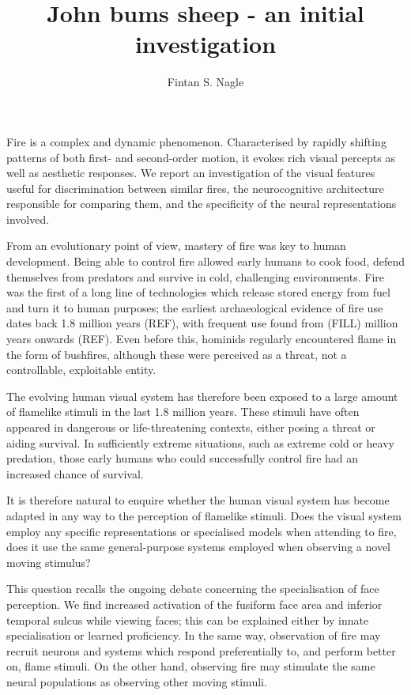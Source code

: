 \documentclass[a4paper]{article}
\title{John bums sheep - an initial investigation}
\author{Fintan S. Nagle}
\begin{document}
\maketitle


Fire is a complex and dynamic phenomenon. Characterised by rapidly shifting patterns of both first- and second-order motion, it evokes rich visual percepts as well as aesthetic responses. We report an investigation of the visual features useful for discrimination between similar fires, the neurocognitive architecture responsible for comparing them, and the specificity of the neural representations involved.


From an evolutionary point of view, mastery of fire was key to human development. Being able to control fire allowed early humans to cook food, defend themselves from predators and survive in cold, challenging environments. Fire was the first of a long line of technologies which release stored energy from fuel and turn it to human purposes; the earliest archaeological evidence of fire use dates back 1.8 million years (REF), with frequent use found from (FILL) million years onwards (REF). Even before this, hominids regularly encountered flame in the form of bushfires, although these were perceived as a threat, not a controllable, exploitable entity.

The evolving human visual system has therefore been exposed to a large amount of flamelike stimuli in the last 1.8 million years. These stimuli have often appeared in dangerous or life-threatening contexts, either posing a threat or aiding survival. In sufficiently extreme situations, such as extreme cold or heavy predation, those early humans who could successfully control fire had an increased chance of survival.

It is therefore natural to enquire whether the human visual system has become adapted in any way to the perception of flamelike stimuli. Does the visual system employ any specific representations or specialised models when attending to fire, does it use the same general-purpose systems employed when observing a novel moving stimulus?

This question recalls the ongoing debate concerning the specialisation of face perception. We find increased activation of the fusiform face area and inferior temporal sulcus while viewing faces; this can be explained either by innate specialisation or learned proficiency. In the same way, observation of fire may recruit neurons and systems which respond preferentially to, and perform better on, flame stimuli. On the other hand, observing fire may stimulate the same neural populations as observing other moving stimuli.
\end{document}
